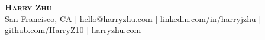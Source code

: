 \pagestyle{fancy}
\fancyhf{} %
\fancyfoot{}
\renewcommand{\headrulewidth}{0pt}
\renewcommand{\footrulewidth}{0pt}

\begin{center}
    \textbf{\Huge\scshape Harry Zhu} \\ \vspace{1pt}
    San Francisco, CA
    $|$ \href{mailto:hello@harryzhu.com}{\underline{hello@harryzhu.com}}
    $|$ \href{https://linkedin.com/in/harryjzhu}{\underline{linkedin.com/in/harryjzhu}}
    $|$ \href{https://github.com/HarryZ10}{\underline{github.com/HarryZ10}}
    $|$ \href{https://harryzhu.com}{\underline{harryzhu.com}}
\end{center}
